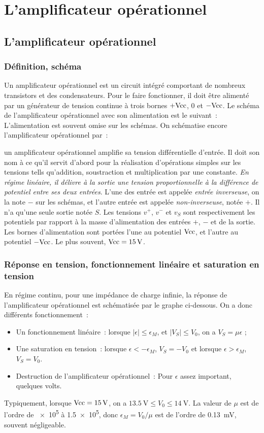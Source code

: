 \chapter{L'amplificateur opérationnel}
\minitoc
\minilof
\minilot
%
\section{L'amplificateur opérationnel}
\subsection{Définition, schéma}
Un amplificateur opérationnel est un circuit intégré comportant de nombreux transistors et des condensateurs. Pour le faire fonctionner, il doit être alimenté par un générateur de tension continue à trois bornes $+\textrm{Vcc}$, $0$ et $-\textrm{Vcc}$. Le schéma de l'amplificateur opérationnel avec son alimentation est le suivant~:
L'alimentation est souvent omise sur les schémas. On schématise encore l'amplificateur opérationnel par~:

un amplificateur opérationnel amplifie sa tension différentielle d'entrée. Il doit son nom à ce qu'il servit d'abord pour la réalisation d'opérations simples sur les tensions tells qu'addition, soustraction et multiplication par une constante. \emph{En régime linéaire, il délivre à la sortie une tension proportionnelle à la différence de potentiel entre ses deux entrées}. L'une des entrée est appelée \emph{entrée inverseuse}, on la note $-$ sur les schémas, et l'autre entrée est appelée \emph{non-inverseuse}, notée $+$. Il n'a qu'une seule sortie notée $S$. Les tensions $v^+$, $v^-$ et $v_S$ sont respectivement les potentiels par rapport à la masse d'alimentation des entrées $+$, $-$ et de la sortie. Les bornes d'alimentation sont portées l'une au potentiel $\textrm{Vcc}$, et l'autre au potentiel $-\textrm{Vcc}$. Le plus souvent, $\textrm{Vcc} = \SI{15}{\volt}$.
\subsection{Réponse en tension, fonctionnement linéaire et saturation en tension}
En régime continu, pour une impédance de charge infinie, la réponse de l'amplificateur opérationnel est schématisée par le graphe ci-dessous.%
On a donc différents fonctionnement~:
\begin{itemize}
	\item Un fonctionnement linéaire~: lorsque $\mid \epsilon \mid \leq \epsilon_M$, et $\mid V_S \mid \leq V_0$, on a $V_S = \mu \epsilon$ ;
	\item Une saturation en tension~: lorsque $\epsilon < -\epsilon_M$, $V_S = -V_0$ et lorsque $\epsilon > \epsilon_M$, $V_S = V_0$.
	\item Destruction de l'amplificateur opérationnel~: Pour $\epsilon$ assez important, quelques volts.
\end{itemize}
Typiquement, lorsque $\textrm{Vcc} = \SI{15}{\volt}$, on a $\SI{13.5}{\volt} \leq V_0 \leq \SI{14}{\volt}$. La valeur de $\mu$ est de l'ordre de \num{e5} à \num{1.5e5}, donc $\epsilon_M = V_0/\mu$ est de l'ordre de \SI{0.13}{\milli\volt}, souvent négligeable.

